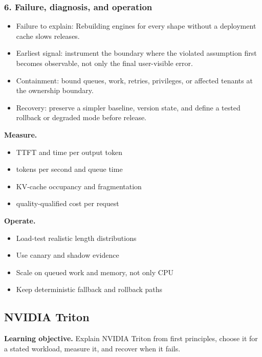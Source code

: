 \subsubsection*{6. Failure, diagnosis, and operation}
\begin{itemize}
\item Failure to explain: Rebuilding engines for every shape without a deployment cache slows releases.
\item Earliest signal: instrument the boundary where the violated assumption first becomes observable, not only the final user-visible error.
\item Containment: bound queues, work, retries, privileges, or affected tenants at the ownership boundary.
\item Recovery: preserve a simpler baseline, version state, and define a tested rollback or degraded mode before release.
\end{itemize}
\textbf{Measure.}\begin{itemize}
\item TTFT and time per output token
\item tokens per second and queue time
\item KV-cache occupancy and fragmentation
\item quality-qualified cost per request
\end{itemize}
\textbf{Operate.}\begin{itemize}
\item Load-test realistic length distributions
\item Use canary and shadow evidence
\item Scale on queued work and memory, not only CPU
\item Keep deterministic fallback and rollback paths
\end{itemize}
\subsection{NVIDIA Triton}
\textbf{Learning objective.} Explain NVIDIA Triton from first principles, choose it for a stated workload, measure it, and recover when it fails.
